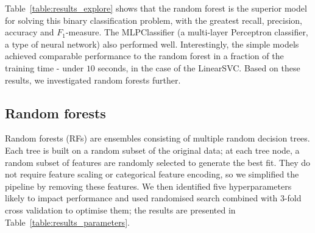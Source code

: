 \documentclass[12pt,a4paper]{article}
\begin{document}
Table~\ref{table:results_explore} shows that the random forest is the superior model for solving this binary classification problem, with the greatest recall, precision, accuracy and $F_1$-measure. The MLPClassifier (a multi-layer Perceptron classifier, a type of neural network) also performed well. Interestingly, the simple models achieved comparable performance to the random forest in a fraction of the training time - under $10$ seconds, in the case of the LinearSVC.  Based on these results, we investigated random forests further.

\subsection{Random forests}

Random forests (RFs) are ensembles consisting of multiple random decision trees. Each tree is built on a random subset of the original data; at each tree node, a random subset of features are randomly selected to generate the best fit. They do not require feature scaling or categorical feature encoding, so we simplified the pipeline by removing these features. We then identified five hyperparameters likely to impact performance and used randomised search combined with $3$-fold cross validation to optimise them; the results are presented in Table~\ref{table:results_parameters}.
\end{document}

